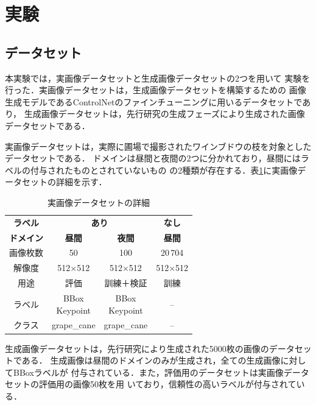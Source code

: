 \documentclass[Japanese]{dicomopapers}
\begin{document}
\section{実験}
  \subsection{データセット}

  本実験では，実画像データセットと生成画像データセットの2つを用いて
  実験を行った．実画像データセットは，生成画像データセットを構築するための
  画像生成モデルであるControlNetのファインチューニングに用いるデータセットであり，
  生成画像データセットは，先行研究の生成フェーズにより生成された画像データセットである．
  
  実画像データセットは，実際に圃場で撮影されたワインブドウの枝を対象としたデータセットである．
  ドメインは昼間と夜間の2つに分かれており，昼間にはラベルの付与されたものとされていないもの
  の2種類が存在する．表\ref{tab:summary_dataset}に実画像データセットの詳細を示す．
    
  \begin{table}[t]
    \centering
    \caption{実画像データセットの詳細}
    \label{tab:summary_dataset}
    \begin{tabular}{@{}cccc@{}} %
      \toprule
      \textbf{ラベル}
        & \multicolumn{2}{c}{\textbf{あり}}
        & \textbf{なし} \\
      \cmidrule(lr){2-3}\cmidrule(lr){4-4}
      \textbf{ドメイン}
        & \textbf{昼間}
        & \textbf{夜間}
        & \textbf{昼間} \\
      \midrule
      画像枚数
        & 50
        & 100
        & 20\,704 \\
      解像度
        & 512×512
        & 512×512
        & 512×512 \\
      用途
        & 評価
        & 訓練＋検証
        & 訓練 \\
      \midrule
      ラベル
        & \makecell[c]{BBox\\Keypoint}
        & \makecell[c]{BBox\\Keypoint}
        & -- \\
      クラス
        & grape\_cane
        & grape\_cane
        & -- \\
      \bottomrule
    \end{tabular}
  \end{table}
  \setlength{\textfloatsep}{8pt}

  生成画像データセットは，先行研究により生成された5000枚の画像のデータセットである．
  生成画像は昼間のドメインのみが生成され，全ての生成画像に対してBBoxラベルが
  付与されている．また，評価用のデータセットは実画像データセットの評価用の画像50枚を用
  いており，信頼性の高いラベルが付与されている．
\end{document}
